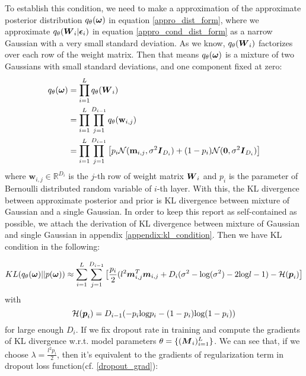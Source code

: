 To establish this condition, we need to make a approximation of the approximate posterior distribution $q_{\theta}(\boldsymbol \omega)$ in equation \ref{appro_dist_form}, where we approximate $q_{\theta}(\boldsymbol W_{i}|\boldsymbol \epsilon_{i})$ in equation \ref{appro_cond_dist_form} as a narrow Gaussian with a very small standard deviation. As we know, $q_{\theta}(\boldsymbol W_{i})$ factorizes over each row of the weight matrix. Then that means $q_{\theta}(\boldsymbol \omega)$ is a mixture of two Gaussians with small standard deviations, and one component fixed at zero:
\begin{equation}\label{appro_dist_guassian}
\begin{aligned}
	q_{\theta}(\boldsymbol \omega) &= \prod_{i=1}^{L}q_{\theta}(\boldsymbol W_{i}) \\
	&=\prod_{i=1}^{L}\prod_{j=1}^{D_{i-1}}q_{\theta}(\textbf{w}_{i,j}) \\
	&= \prod_{i=1}^{L}\prod_{j=1}^{D_{i-1}} \big[ p_{i} \mathcal N(\textbf{m}_{i,j},\sigma^{2} \boldsymbol I_{D_{i}}) + (1-p_{i})\mathcal N(\boldsymbol 0, \sigma^{2} \boldsymbol I_{D_{i}})\big]
\end{aligned}
\end{equation}
where $\textbf{w}_{i,j} \in \mathbb R^{D_{i}}$ is the $j$-th row of weight matrix $\boldsymbol W_{i}$ and $p_{i}$ is the parameter of Bernoulli distributed random variable of $i$-th layer. With this, the KL divergence between approximate posterior and prior is KL divergence between mixture of Gaussian and a single Gaussian. In order to keep this report as self-contained as possible, we attach the derivation of KL divergence between mixture of Gaussian and single Gaussian in appendix \ref{appendix:kl_condition}. Then we have KL condition in the following:

\begin{equation}
\begin{aligned} \label{kl_condition}
KL(q_{\theta}(\boldsymbol \omega) || p(\boldsymbol \omega)) \approx \sum_{i=1}^{L} \sum_{j=1}^{D_{i-1}}
\big[
\frac{p_{i}}{2}(l^{2}\boldsymbol m_{i,j}^{T} \boldsymbol m_{i,j} + D_{i}( \sigma^{2} -\text{log}(\sigma^{2}) -2\text{log} l- 1) - \mathcal H (\boldsymbol p_{i}) 
\big] 
\end{aligned} 
\end{equation}
with 
\[
\mathcal H(\boldsymbol p_{i}) = D_{i-1}(-p_{i}\text{log}p_{i} - (1-p_{i})\text{log}(1-p_{i}))
\]
for large enough $D_{i}$. If we fix dropout rate in training and compute the gradients of KL divergence w.r.t. model parameters $\theta = \{(\boldsymbol M_{i})_{i=1}^{L} \}$. We can see that, if we choose $\lambda = \frac{l^{2}p_{i}}{2}$, then it's equivalent to the gradients of regularization term in dropout loss function(cf. \ref{dropout_grad}):

